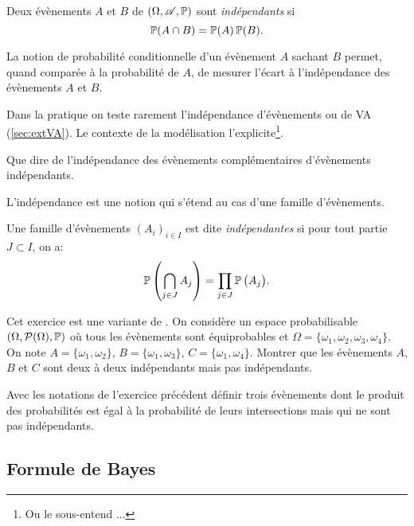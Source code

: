 \documentclass[11pt, a4paper]{article}
\begin{document}
\begin{defn}
  Deux évènements $A$ et $B$ de $(\Omega, \mathscr{A}, \operatorname{\mathbb{P}})$ sont
  \emph{indépendants} si
  \[
    \operatorname{\mathbb{P}}(A \cap B) = \operatorname{\mathbb{P}}(A)\operatorname{\mathbb{P}}(B).
  \]
\end{defn}
\begin{rem}
  La notion de probabilité conditionnelle d'un évènement $A$ sachant
  $B$ permet, quand comparée à la probabilité de $A$, de mesurer
  l'écart à l'indépendance des évènements $A$ et $B$.
\end{rem}
\begin{rem}
  Dans la pratique on teste rarement l'indépendance d'évènements ou de
  VA (\ref{sec:extVA}). Le contexte de la modélisation
  l'explicite\footnote{Ou le sous-entend ... }.
\end{rem}
\begin{question}
  Que dire de l'indépendance des évènements complémentaires
  d'évènements indépendants.
\end{question}
L'indépendance est une notion qui s'étend au cas d'une famille
d'évènements.
\begin{defn}
  Une famille d'évènements $(A_i)_{i \in I}$ est dite
  \emph{indépendantes} si pour tout partie $J \subset I$, on a:
  \[
    \operatorname{\mathbb{P}}\left(\bigcap_{j \in J} A_j\right) = \prod_{j \in J}
    \operatorname{\mathbb{P}}\big(A_j\big).
  \]
\end{defn}
\begin{question}
  Cet exercice est une variante de \cite[Exemple
  3.1]{ouvrard1998probabilites}.  On considère un espace
  probabilisable $(\Omega, \mathcal{P}(\Omega), \operatorname{\mathbb{P}})$ où tous les
  évènements sont équiprobables et
  $\Omega = \{\omega_1, \omega_2, \omega_3, \omega_4\}$. On note
  $A = \{\omega_1, \omega_2\}$, $B = \{\omega_1, \omega_3\}$,
  $C = \{\omega_1, \omega_4\}$. Montrer que les évènements $A$, $B$ et
  $C$ sont deux à deux indépendants mais pas indépendants.
\end{question}
\begin{question}
  Avec les notations de l'exercice précédent définir trois évènements
  dont le produit des probabilités est égal à la probabilité de leurs
  intersections mais qui ne sont pas indépendants.
\end{question}

\subsection{Formule de Bayes}
\label{sec:bayes}
\end{document}
